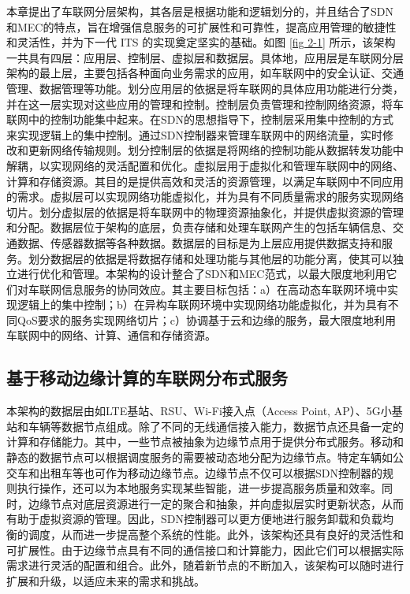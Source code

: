 本章提出了车联网分层架构，其各层是根据功能和逻辑划分的，并且结合了SDN和MEC的特点，旨在增强信息服务的可扩展性和可靠性，提高应用管理的敏捷性和灵活性，并为下一代 ITS 的实现奠定坚实的基础。如图 \ref{fig 2-1} 所示，该架构一共具有四层：应用层、控制层、虚拟层和数据层。具体地，应用层是车联网分层架构的最上层，主要包括各种面向业务需求的应用，如车联网中的安全认证、交通管理、数据管理等功能。划分应用层的依据是将车联网的具体应用功能进行分类，并在这一层实现对这些应用的管理和控制。控制层负责管理和控制网络资源，将车联网中的控制功能集中起来。在SDN的思想指导下，控制层采用集中控制的方式来实现逻辑上的集中控制。通过SDN控制器来管理车联网中的网络流量，实时修改和更新网络传输规则。划分控制层的依据是将网络的控制功能从数据转发功能中解耦，以实现网络的灵活配置和优化。虚拟层用于虚拟化和管理车联网中的网络、计算和存储资源。其目的是提供高效和灵活的资源管理，以满足车联网中不同应用的需求。虚拟层可以实现网络功能虚拟化，并为具有不同质量需求的服务实现网络切片。划分虚拟层的依据是将车联网中的物理资源抽象化，并提供虚拟资源的管理和分配。数据层位于架构的底层，负责存储和处理车联网产生的包括车辆信息、交通数据、传感器数据等各种数据。数据层的目标是为上层应用提供数据支持和服务。划分数据层的依据是将数据存储和处理功能与其他层的功能分离，使其可以独立进行优化和管理。本架构的设计整合了SDN和MEC范式，以最大限度地利用它们对车联网信息服务的协同效应。其主要目标包括：a）在高动态车联网环境中实现逻辑上的集中控制；b）在异构车联网环境中实现网络功能虚拟化，并为具有不同QoS要求的服务实现网络切片；c）协调基于云和边缘的服务，最大限度地利用车联网中的网络、计算、通信和存储资源。

\subsection[\hspace{-2pt}基于移动边缘计算的车联网分布式服务]{{ \hspace{-8pt}基于移动边缘计算的车联网分布式服务}}

本架构的数据层由如LTE基站、RSU、Wi-Fi接入点（Access Point, AP）、5G小基站和车辆等数据节点组成。除了不同的无线通信接入能力，数据节点还具备一定的计算和存储能力。其中，一些节点被抽象为边缘节点用于提供分布式服务。移动和静态的数据节点可以根据调度服务的需要被动态地分配为边缘节点。特定车辆如公交车和出租车等也可作为移动边缘节点。边缘节点不仅可以根据SDN控制器的规则执行操作，还可以为本地服务实现某些智能，进一步提高服务质量和效率。同时，边缘节点对底层资源进行一定的聚合和抽象，并向虚拟层实时更新状态，从而有助于虚拟资源的管理。因此，SDN控制器可以更方便地进行服务卸载和负载均衡的调度，从而进一步提高整个系统的性能。此外，该架构还具有良好的灵活性和可扩展性。由于边缘节点具有不同的通信接口和计算能力，因此它们可以根据实际需求进行灵活的配置和组合。此外，随着新节点的不断加入，该架构可以随时进行扩展和升级，以适应未来的需求和挑战。

